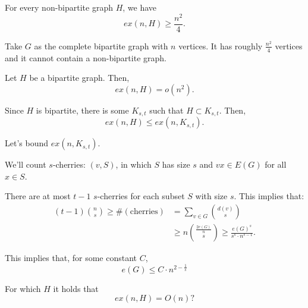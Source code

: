 \begin{prop}
	For every non-bipartite graph $H$, we have \[
		ex(n, H) \ge \frac{n^2}{4}.
	\]
\end{prop}

\begin{dem}
	Take $G$ as the complete bipartite graph with $n$ vertices. It has roughly $\frac{n^2}{4}$ vertices and it cannot contain a non-bipartite graph.
\end{dem}

\begin{thm}
	Let $H$ be a bipartite graph. Then, \[
		ex(n, H) = o(n^2).
	\]
\end{thm}

\begin{dem}
	Since $H$ is bipartite, there is some $K_{s,t}$ such that $H \subset K_{s, t}$. Then, \[
		ex(n, H) \le ex(n, K_{s, t}).
	\]

	Let's bound $ex(n, K_{s, t})$.

	We'll count $s$-cherries: $(v, S)$, in which $S$ has size $s$ and $vx \in E(G)$ for all $x \in S$.


	There are at most $t-1$ $s$-cherries for each subset $S$ with size $s$. This implies that:
	 \begin{align*}
		 (t-1)\binom{n}{s} \ge \#(\text{cherries}) &= \sum_{v \in G} \binom{d(v)}{s}\\
			&\ge n\binom{\frac{2e(G)}{n}}{s} \ge \frac{e(G)^s}{s^s\cdot n^{s-1}}.
	\end{align*}

	This implies that, for some constant $C$, \[
		e(G) \le C \cdot n^{2 - \frac{1}{s}}
	\]

\end{dem}

\begin{ques}
	For which $H$ it holds that \[
		ex(n, H) = O(n)?
	\]
\end{ques}
